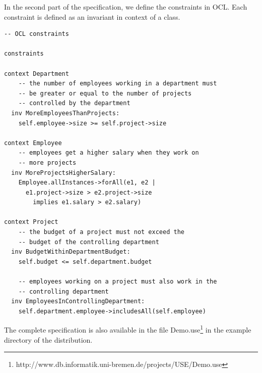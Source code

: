 \documentclass[a4paper,titlepage,oneside,final]{scrreprt} %
\begin{document}
In the second part of the specification, we define the constraints in OCL.
Each constraint is defined as an invariant in context of a class.
\begin{verbatim}
-- OCL constraints

constraints

context Department
    -- the number of employees working in a department must
    -- be greater or equal to the number of projects
    -- controlled by the department
  inv MoreEmployeesThanProjects:
    self.employee->size >= self.project->size

context Employee
    -- employees get a higher salary when they work on
    -- more projects
  inv MoreProjectsHigherSalary:
    Employee.allInstances->forAll(e1, e2 |
      e1.project->size > e2.project->size
        implies e1.salary > e2.salary)

context Project
    -- the budget of a project must not exceed the
    -- budget of the controlling department
  inv BudgetWithinDepartmentBudget:
    self.budget <= self.department.budget

    -- employees working on a project must also work in the
    -- controlling department
  inv EmployeesInControllingDepartment:
    self.department.employee->includesAll(self.employee)
\end{verbatim}
The complete specification is also available in the file Demo.use\footnote{http://www.db.informatik.uni-bremen.de/projects/USE/Demo.use}
in the example directory of the distribution.
\end{document}

